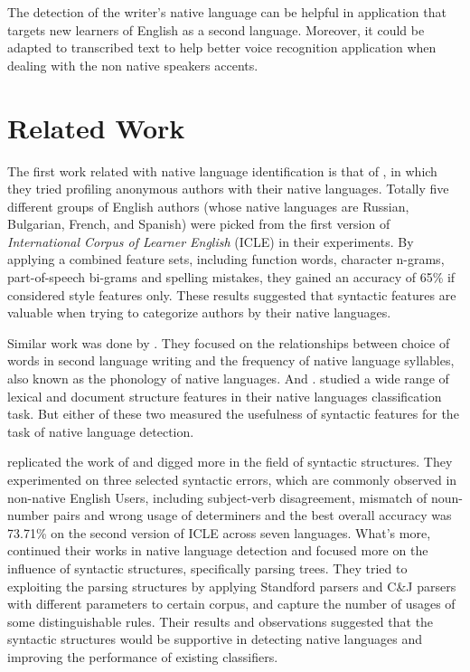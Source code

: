 \documentclass[11pt]{article}
\begin{document}
The detection of the writer's native language can be helpful in application that targets new learners of English as a second language. Moreover, it could be adapted to transcribed text to help better voice recognition application when dealing with the non native speakers accents.



\section{Related Work}

The first work related with native language identification is that of , in which they tried profiling anonymous authors with their native languages. Totally five different groups of English authors (whose native languages are Russian, Bulgarian, French, and Spanish) were picked from the first version of {\em International Corpus of Learner English} (ICLE) in their experiments. By applying a combined feature sets, including function words, character n-grams, part-of-speech bi-grams and spelling mistakes, they gained an accuracy of 65\% if considered style features only. These results suggested that syntactic features are valuable when trying to categorize authors by their native languages.  

Similar work was done by . They focused on the relationships between choice of words in second language writing and the frequency of native language syllables, also known as the phonology of native languages. And . studied a wide range of lexical and document structure features in their native languages classification task. But either of these two measured the usefulness of syntactic features for the task of native language detection.

 replicated the work of  and digged more in the field of syntactic structures. They experimented on three selected syntactic errors, which are commonly observed in non-native English Users, including subject-verb disagreement, mismatch of noun-number pairs and wrong usage of determiners and the best overall accuracy was 73.71\% on the second version of ICLE across seven languages. What's more,  continued their works in native language detection and focused more on the influence of syntactic structures, specifically parsing trees. They tried to exploiting the parsing structures by applying Standford parsers and C\&J parsers with different parameters to certain corpus, and capture the number of usages of some distinguishable rules. Their results and observations suggested that the syntactic structures would be supportive in detecting native languages and improving the performance of existing classifiers.
\end{document}
